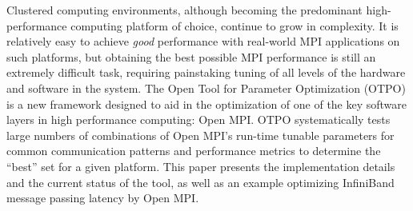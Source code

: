 Clustered computing environments, although becoming the predominant
high-performance computing platform of choice, continue to grow in
complexity.  
%
It is relatively easy to achieve {\em good} performance with
real-world MPI applications on such platforms, but obtaining the best
possible MPI performance is still an extremely difficult task,
requiring painstaking tuning of all levels of the hardware and
software in the system.
%
The Open Tool for Parameter Optimization (OTPO) is a new framework
designed to aid in the optimization of one of the key software layers in
high performance computing: Open MPI.
%
OTPO systematically tests large numbers of combinations of Open MPI's
run-time tunable parameters for common communication patterns and
performance metrics to determine the ``best'' set for a given
platform.
%
This paper presents the implementation details and the current status of
the tool, as well as an example optimizing InfiniBand message passing
latency by Open MPI.
